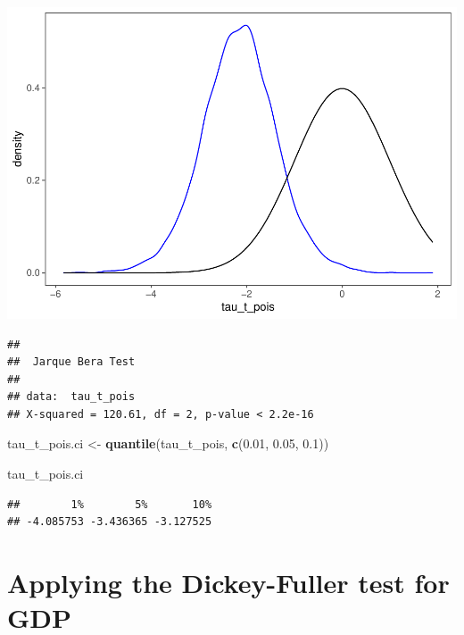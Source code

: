 \documentclass[11pt, a4paper]{report}
\newenvironment{Shaded}{\begin{snugshade}}{\end{snugshade}}
\newcommand{\CommentTok}[1]{\textcolor[rgb]{0.56,0.35,0.01}{\textit{#1}}}
\newcommand{\FloatTok}[1]{\textcolor[rgb]{0.00,0.00,0.81}{#1}}
\newcommand{\KeywordTok}[1]{\textcolor[rgb]{0.13,0.29,0.53}{\textbf{#1}}}
\newcommand{\NormalTok}[1]{#1}
\newcommand{\StringTok}[1]{\textcolor[rgb]{0.31,0.60,0.02}{#1}}
\theoremstyle{plain}
\theoremstyle{plain}
\theoremstyle{remark}
\begin{document}
\begin{center}\includegraphics{Econo2_P6_files/figure-latex/monte carlo poisson-1} \end{center}

\begin{Shaded}
\end{Shaded}

\begin{verbatim}
## 
##  Jarque Bera Test
## 
## data:  tau_t_pois
## X-squared = 120.61, df = 2, p-value < 2.2e-16
\end{verbatim}

\begin{Shaded}
\begin{Highlighting}[]
\NormalTok{tau_t_pois.ci <-}\StringTok{ }\KeywordTok{quantile}\NormalTok{(tau_t_pois, }\KeywordTok{c}\NormalTok{(}\FloatTok{0.01}\NormalTok{, }\FloatTok{0.05}\NormalTok{, }\FloatTok{0.1}\NormalTok{))}

\NormalTok{tau_t_pois.ci}
\end{Highlighting}
\end{Shaded}

\begin{verbatim}
##        1%        5%       10% 
## -4.085753 -3.436365 -3.127525
\end{verbatim}

\section{Applying the Dickey-Fuller test for GDP}
\end{document}
